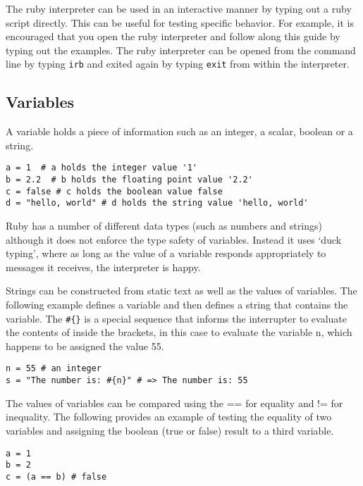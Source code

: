The ruby interpreter can be used in an interactive manner by typing out a ruby script directly. This can be useful for testing specific behavior. For example, it is encouraged that you open the ruby interpreter and follow along this guide by typing out the examples. The ruby interpreter can be opened from the command line by typing \texttt{irb} and exited again by typing \texttt{exit} from within the interpreter.

\subsection{Variables}
A variable holds a piece of information such as an integer, a scalar, boolean or a string.

\begin{lstlisting}
a = 1  # a holds the integer value '1'
b = 2.2  # b holds the floating point value '2.2'
c = false # c holds the boolean value false
d = "hello, world" # d holds the string value 'hello, world'

\end{lstlisting}

Ruby has a number of different data types (such as numbers and strings) although it does not enforce the type safety of variables. Instead it uses `duck typing', where as long as the value of a variable responds appropriately to messages it receives, the interpreter is happy.

Strings can be constructed from static text as well as the values of variables. The following example defines a variable and then defines a string that contains the variable. The \texttt{\#\{\}} is a special sequence that informs the interrupter to evaluate the contents of inside the brackets, in this case to evaluate the variable n, which happens to be assigned the value 55.

\begin{lstlisting}
n = 55 # an integer 
s = "The number is: #{n}" # => The number is: 55
\end{lstlisting}

The values of variables can be compared using the == for equality and != for inequality. The following provides an example of testing the equality of two variables and assigning the boolean (true or false) result to a third variable.

\begin{lstlisting}
a = 1
b = 2
c = (a == b) # false
\end{lstlisting}

